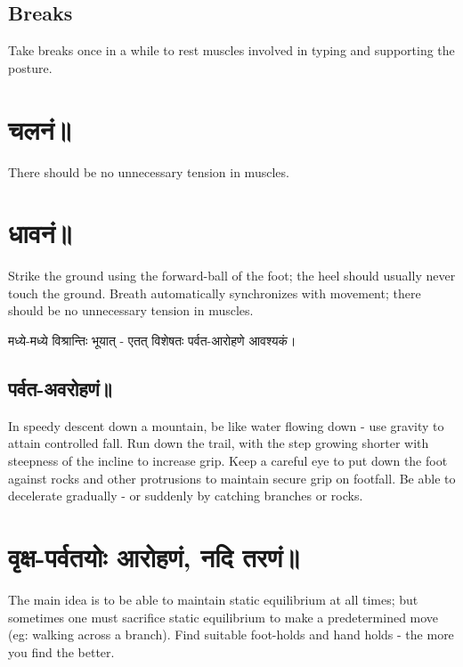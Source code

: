 \documentclass[oneside, article]{memoir}
\begin{document}
\section{Breaks}
Take breaks once in a while to rest muscles involved in typing and supporting the posture.

\chapter{चलनं॥}
There should be no unnecessary tension in muscles.

\chapter{धावनं॥}
Strike the ground using the forward-ball of the foot; the heel should usually never touch the ground. Breath automatically synchronizes with movement; there should be no unnecessary tension in muscles.

मध्ये-मध्ये विश्रान्तिः भूयात् - एतत् विशेषतः पर्वत-आरोहणे आवश्यकं।

\section{पर्वत-अवरोहणं॥}
In speedy descent down a mountain, be like water flowing down - use gravity to attain controlled fall. Run down the trail, with the step growing shorter with steepness of the incline to increase grip. Keep a careful eye to put down the foot against rocks and other protrusions to maintain secure grip on footfall. Be able to decelerate gradually - or suddenly by catching branches or rocks.

\chapter{वृक्ष-पर्वतयोः आरोहणं, नदि तरणं॥}
The main idea is to be able to maintain static equilibrium at all times; but sometimes one must sacrifice static equilibrium to make a predetermined move (eg: walking across a branch). Find suitable foot-holds and hand holds - the more you find the better.
\end{document}
